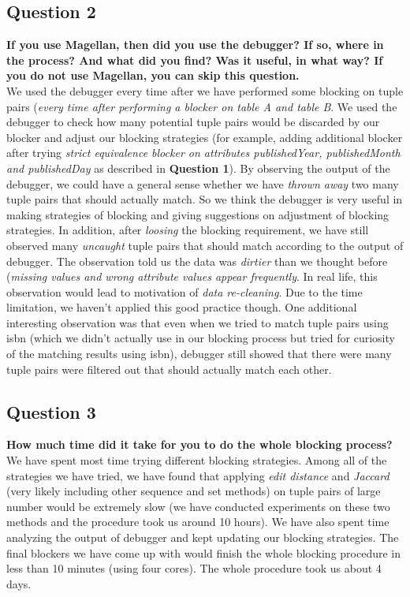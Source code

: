 \documentclass[10pt, oneside]{article}
\begin{document}
\subsection*{Question 2}
\textbf{If you use Magellan, then did you use the debugger? If so, where in the process? And what did you find? Was it useful, in what way? If you do not use Magellan, you can skip this question. }
\vspace{1ex}
\\
We used the debugger every time after we have performed some blocking on tuple pairs (\textit{every time after performing a blocker on table A and table B}. We used the debugger to check how many potential tuple pairs would be 
discarded by our blocker and adjust our blocking strategies (for example, adding additional blocker after trying \textit{strict equivalence blocker on attributes publishedYear, publishedMonth and publishedDay} as described in \textbf{Question 1}). By observing the output of the debugger, we could have a general sense whether we have \textit{thrown away} two many tuple pairs that should actually match. So we think the debugger is very useful in making strategies of blocking and giving suggestions on adjustment of blocking strategies. In addition, after \textit{loosing} the blocking requirement, we have still observed many \textit{uncaught} tuple pairs that should match according to the output of debugger. The observation told us the data was \textit{dirtier} than we thought before (\textit{missing values and wrong attribute values appear frequently}. In real life, this observation would lead to motivation of \textit{data re-cleaning}. Due to the time limitation, we haven't applied this good practice though. One additional interesting observation was that even when we tried to match tuple pairs using isbn (which we didn't actually use in our blocking process
but tried for curiosity of the matching results using isbn), debugger still showed that there were many tuple pairs were filtered out that should actually match each other.

\subsection*{Question 3}
\textbf{How much time did it take for you to do the whole blocking process?}
\vspace{1ex}
\\
We have spent most time trying different blocking strategies. Among all of the strategies we have tried, we have found that applying \textit{edit distance} and \textit{Jaccard} (very likely including other sequence and set methods) on 
tuple pairs of large number would be extremely slow (we have conducted experiments on these two methods and the procedure took us around 10 hours). We have also spent time analyzing the output of debugger and kept updating
our blocking strategies. The final blockers we have come up with would finish the whole blocking procedure in less than 10 minutes (using four cores). The whole procedure took us about 4 days.
\end{document}
